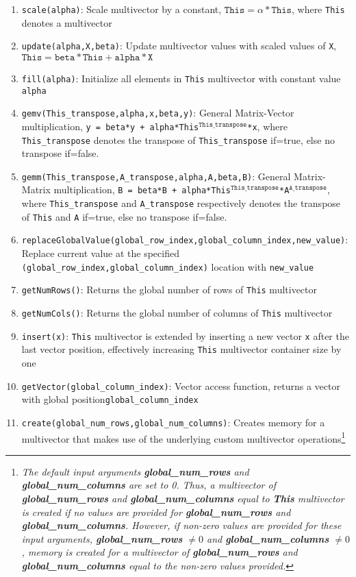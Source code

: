     \begin{enumerate}
    \item \texttt{scale(alpha)}: Scale multivector by a constant, $\mathtt{This} = \alpha\ast\mathtt{This}$, where \texttt{This} denotes a multivector
    \item \texttt{update(alpha,X,beta)}: Update multivector values with scaled values of \texttt{X}, $\mathtt{This} = \mathtt{beta}\ast\mathtt{This} + \mathtt{alpha}\ast\mathtt{X}$
    \item \texttt{fill(alpha)}: Initialize all elements in \texttt{This} multivector with constant value \texttt{alpha}
    \item \texttt{gemv(This\_transpose,alpha,x,beta,y)}: General Matrix-Vector multiplication, \texttt{y = beta*y + alpha*This$^{\mathtt{This\_transpose}}$*x}, where \texttt{This\_transpose} denotes the transpose of \texttt{This\_transpose} if=true, else no transpose if=false.
    \item \texttt{gemm(This\_transpose,A\_transpose,alpha,A,beta,B)}: General Matrix-Matrix multiplication, \texttt{B = beta*B + alpha*This$^{\mathtt{This\_transpose}}$*A$^{\mathtt{A\_transpose}}$}, where \texttt{This\_transpose} and \texttt{A\_transpose} respectively denotes the transpose of \texttt{This} and \texttt{A} if=true, else no transpose if=false.
    \item \texttt{replaceGlobalValue(global\_row\_index,global\_column\_index,new\_value)}: Replace current value at the specified \texttt{(global\_row\_index,global\_column\_index)} location with \texttt{new\_value}
    \item \texttt{getNumRows()}: Returns the global number of rows of \texttt{This} multivector
    \item \texttt{getNumCols()}: Returns the global number of columns of \texttt{This} multivector
    \item \texttt{insert(x)}: \texttt{This} multivector is extended by inserting a new vector \texttt{x} after the last vector position, effectively increasing \texttt{This} multivector container size by one
    \item \texttt{getVector(global\_column\_index)}: Vector access function, returns a vector with global position\texttt{global\_column\_index}
    \item \texttt{create(global\_num\_rows,global\_num\_columns)}: Creates memory for a multivector that makes use of the underlying custom multivector operations\footnote{\emph{The default input arguments \textbf{global\_num\_rows} and \textbf{global\_num\_columns} are set to 0. Thus, a multivector of \textbf{global\_num\_rows} and \textbf{global\_num\_columns} equal to \textbf{This} multivector is created if no values are provided for \textbf{global\_num\_rows} and \textbf{global\_num\_columns}. However, if non-zero values are provided for these input arguments, \textbf{global\_num\_rows} $\neq0$ and \textbf{global\_num\_columns} $\neq0$, memory is created for a multivector of \textbf{global\_num\_rows} and \textbf{global\_num\_columns} equal to the non-zero values provided.}}

\end{enumerate}
